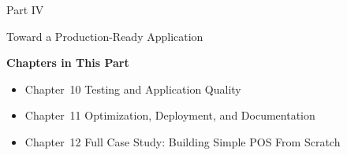 \documentclass[
    paper=23cm:15.5cm,   %
    11pt,               %
    twoside,            %
    openany,            %
    bibliography=totoc, %
]{scrbook}            %
\begin{document}






\newpage
{}
\vspace*{4cm}
{\fontsize{28}{34}\sffamily\bfseries\raggedright Part IV\par}
\vspace{6pt}
{\fontsize{22}{28}\sffamily\bfseries\raggedright Toward a Production-Ready Application\par}
\vspace{16pt}
{\large\sffamily\bfseries Chapters in This Part}\par
\vspace{6pt}
\begin{itemize}[topsep=0pt, itemsep=2pt]
  \item Chapter~10 \textbullet{} Testing and Application Quality
  \item Chapter~11 \textbullet{} Optimization, Deployment, and Documentation
  \item Chapter~12 \textbullet{} Full Case Study: Building Simple POS From Scratch
\end{itemize}
\newpage







\appendix











\backmatter

\nocite{*}

\printbibliography[heading=bibintoc, title={References}]

\printindex
\end{document}
